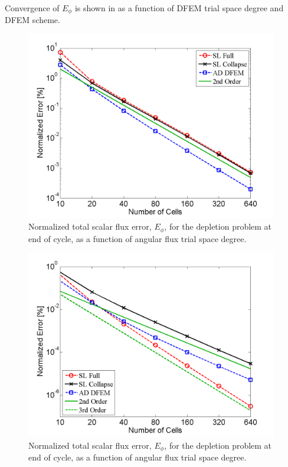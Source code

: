 Convergence of $E_{\phi}$ is shown in  as a function of DFEM trial space degree and DFEM scheme.
\begin{figure}[!htp]
\centering
\includegraphics[width=11cm]{chapter5_depletion/Flux_P1_norm_err.png}
\caption{Normalized total scalar flux error, $E_{\phi}$, for the depletion problem at end of cycle, as a function of angular flux trial space degree.}
\label{fig:depletion_flux_p1}
\end{figure}

\begin{figure}[!hbp]
\centering
\includegraphics[width=11cm]{chapter5_depletion/Flux_P2_norm_err.png}
\caption{Normalized total scalar flux error, $E_{\phi}$, for the depletion problem at end of cycle, as a function of angular flux trial space degree.}
\label{fig:depletion_flux_p2}
\end{figure}


